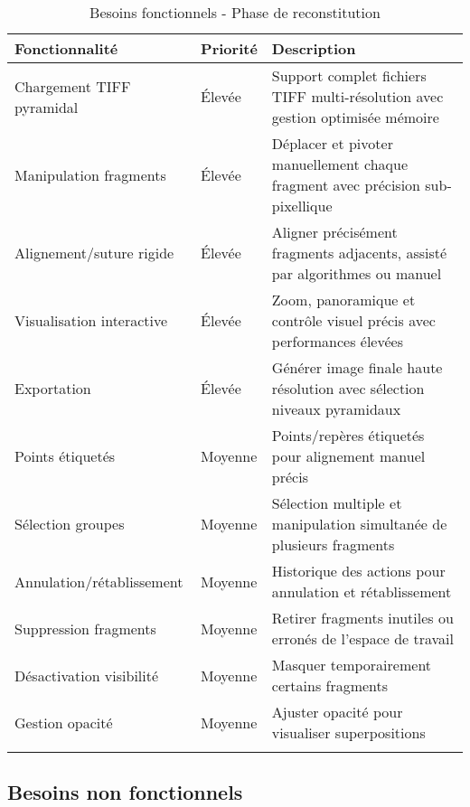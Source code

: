\documentclass[12pt,a4paper]{report}
\begin{document}
\begin{longtable}{|p{3.5cm}|p{1.5cm}|p{9cm}|}
\hline
\rowcolor{TableHeaderColor}
\textbf{Fonctionnalité} & \textbf{Priorité} & \textbf{Description} \\
\hline
\endhead

Chargement TIFF pyramidal & Élevée & Support complet fichiers TIFF multi-résolution avec gestion optimisée mémoire \\
\hline

Manipulation fragments & Élevée & Déplacer et pivoter manuellement chaque fragment avec précision sub-pixellique \\
\hline

Alignement/suture rigide & Élevée & Aligner précisément fragments adjacents, assisté par algorithmes ou manuel \\
\hline

Visualisation interactive & Élevée & Zoom, panoramique et contrôle visuel précis avec performances élevées \\
\hline

Exportation & Élevée & Générer image finale haute résolution avec sélection niveaux pyramidaux \\
\hline

Points étiquetés & Moyenne & Points/repères étiquetés pour alignement manuel précis \\
\hline

Sélection groupes & Moyenne & Sélection multiple et manipulation simultanée de plusieurs fragments \\
\hline

Annulation/rétablissement & Moyenne & Historique des actions pour annulation et rétablissement \\
\hline

Suppression fragments & Moyenne & Retirer fragments inutiles ou erronés de l'espace de travail \\
\hline

Désactivation visibilité & Moyenne & Masquer temporairement certains fragments \\
\hline

Gestion opacité & Moyenne & Ajuster opacité pour visualiser superpositions \\
\hline

\caption{Besoins fonctionnels - Phase de reconstitution}
\end{longtable}

\subsection{Besoins non fonctionnels}
\end{document}
